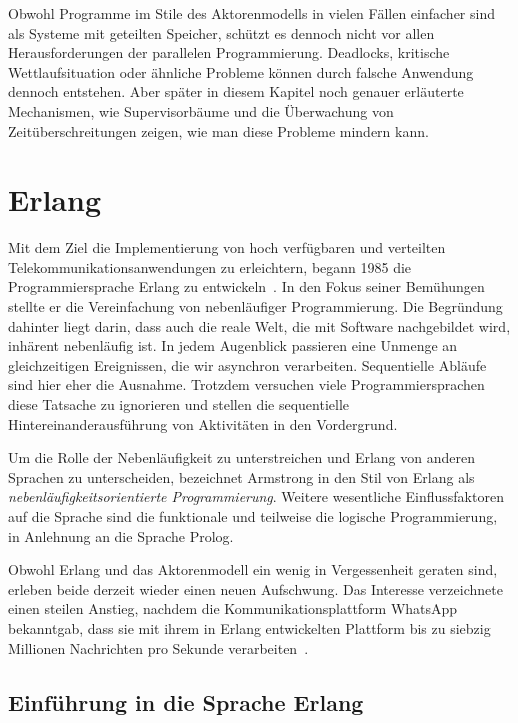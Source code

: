 Obwohl Programme im Stile des Aktorenmodells in vielen Fällen einfacher sind als Systeme mit geteilten Speicher, schützt es dennoch nicht vor allen Herausforderungen der parallelen Programmierung. Deadlocks, kritische Wettlaufsituation oder ähnliche Probleme können durch falsche Anwendung dennoch entstehen. Aber später in diesem Kapitel noch genauer erläuterte Mechanismen, wie Supervisorbäume und die Überwachung von Zeitüberschreitungen zeigen, wie man diese Probleme mindern kann.

\section{Erlang}
\label{sec:erlang}

Mit dem Ziel die Implementierung von hoch verfügbaren und verteilten Telekommunikationsanwendungen zu erleichtern, begann \citeauthor{Armstrong:1997:DE:258948.258967} 1985 die  Programmiersprache Erlang zu entwickeln~\cite{Armstrong:1997:DE:258948.258967}. In den Fokus seiner Bemühungen stellte er die Vereinfachung von nebenläufiger Programmierung. Die Begründung dahinter liegt darin, dass auch die reale Welt, die mit Software nachgebildet wird, inhärent nebenläufig ist. In jedem Augenblick passieren eine Unmenge an gleichzeitigen Ereignissen, die wir asynchron verarbeiten. Sequentielle Abläufe sind hier eher die Ausnahme. Trotzdem versuchen viele Programmiersprachen diese Tatsache zu ignorieren und stellen die sequentielle Hintereinanderausführung von Aktivitäten in den Vordergrund.

Um die Rolle der Nebenläufigkeit zu unterstreichen und Erlang von anderen Sprachen zu unterscheiden, bezeichnet Armstrong in \cite[19]{armstrong03} den Stil von Erlang als \textit{nebenläufigkeitsorientierte Programmierung}. Weitere wesentliche Einflussfaktoren auf die Sprache sind die funktionale und teilweise die logische Programmierung, in Anlehnung an die Sprache Prolog.

Obwohl Erlang und das Aktorenmodell ein wenig in Vergessenheit geraten sind, erleben beide derzeit wieder einen neuen Aufschwung. Das Interesse verzeichnete einen steilen Anstieg, nachdem die Kommunikationsplattform WhatsApp bekanntgab, dass sie mit ihrem in Erlang entwickelten Plattform bis zu siebzig Millionen Nachrichten pro Sekunde verarbeiten~\cite{ErlangWhatsApp}.

\subsection{Einführung in die Sprache Erlang}

